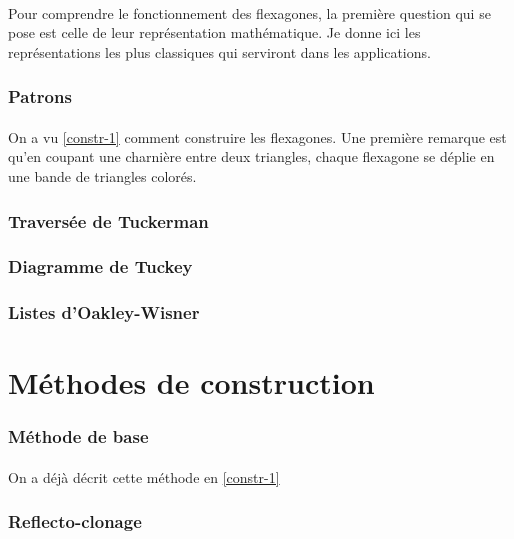 \documentclass[10pt,a4paper]{article}
\begin{document}
		\paragraph{}Pour comprendre le fonctionnement des flexagones, la première question qui se pose est celle de leur représentation mathématique. Je donne ici les représentations les plus classiques qui serviront dans les applications.
		
		\subsubsection{Patrons}
			\paragraph{}On a vu \ref{constr-1} comment construire les flexagones. Une première remarque est qu'en coupant une charnière entre deux triangles, chaque flexagone se déplie en une bande de triangles colorés.
			
		\subsubsection{Traversée de Tuckerman}
		
		\subsubsection{Diagramme de Tuckey}
		
		\subsubsection{Listes d'Oakley-Wisner}


	\section{Méthodes de construction}
		\subsubsection{Méthode de base}
			\paragraph{}On a déjà décrit cette méthode en \ref{constr-1}
			
		\subsubsection{Reflecto-clonage}
\end{document}
